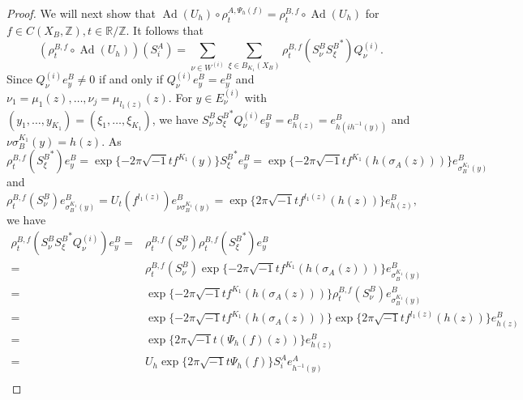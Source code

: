 \documentclass[11pt]{article}
\theoremstyle{plain}
\theoremstyle{definition}
\numberwithin{equation}{section}
\newcommand{\Ad}{\operatorname{Ad}}
\newcommand{\RZ}{\mathbb{R}/{\mathbb{Z}}}
\newcommand{\Z}{\mathbb{Z}}
\begin{document}
\begin{proof}
We will next show that 
$
\Ad(U_h) \circ  \rho^{A,\Psi_h(f)}_t
= \rho^{B,f}_t \circ \Ad(U_h)
$
for $f \in C(X_B,\Z),
t \in \RZ.
$
It follows that 
\begin{equation}
(\rho^{B,f}_t \circ \Ad(U_h)) (S_i^A) 
 =  \sum_{\nu \in W^{(i)}} \sum_{\xi\in B_{K_1}(X_B)}
    \rho_t^{B,f}(S_{\nu}^B {S_\xi^B}^*) Q_\nu^{(i)}. \label{eq:rhoBtf}
\end{equation}
Since
$Q_\nu^{(i)}e_y^B \ne 0$ if and only if
$Q_\nu^{(i)}e_y^B  = e_y^B$ and $\nu_1 = \mu_1(z),\dots, \nu_j = \mu_{l_1(z)}(z)$.
For $y \in E_\nu^{(i)}$
with $(y_1,\dots,y_{K_1}) = (\xi_1,\dots,\xi_{K_1})$, 
we have 
$S_{\nu}^B {S_\xi^B}^* Q_\nu^{(i)}e_y^B = e_{h(z)}^B = e_{h(ih^{-1}(y))}^B$
and
$\nu \sigma_B^{K_1}(y) = h(z).$
As
\begin{equation*}
\rho_t^{B,f}({S_\xi^B}^*)e_y^B 
=\exp\{-2\pi \sqrt{-1}t f^{K_1}(y) \}{S_\xi^B}^* e_y^B 
=\exp\{-2\pi \sqrt{-1}t f^{K_1}(h(\sigma_A(z)))\}
e_{\sigma_B^{K_1}(y)}^B 
\end{equation*}
and
\begin{equation*}
\rho_t^{B,f}(S_{\nu}^B) e_{\sigma_B^{K_1}(y)}^B
  = U_t(f^{l_1(z)} )  e_{\nu \sigma_B^{K_1}(y)}^B   
  =\exp\{2\pi \sqrt{-1}t f^{l_1(z)} (h(z))\} e_{h(z)}^B, 
\end{equation*}
we have  
\begin{align*}
    \rho_t^{B,f}(S_{\nu}^B {S_\xi^B}^* Q_\nu^{(i)} ) e_y^B 
=  & \rho_t^{B,f}(S_{\nu}^B) \rho_t^{B,f}({S_\xi^B}^*)e_y^B \\
=  & \rho_t^{B,f}(S_{\nu}^B) 
     \exp\{-2\pi \sqrt{-1}t f^{K_1}(h(\sigma_A(z)))\}
     e_{\sigma_B^{K_1}(y)}^B  \\
=  & \exp\{-2\pi \sqrt{-1}t f^{K_1}(h(\sigma_A(z))) \}
     \rho_t^{B,f}(S_{\nu}^B) e_{\sigma_B^{K_1}(y)}^B  \\
=  & \exp\{-2\pi \sqrt{-1}t f^{K_1}(h(\sigma_A(z))) \}
     \exp\{2\pi \sqrt{-1}t f^{l_1(z)}(h(z)) \}
     e_{h(z)}^B \\
= & \exp\{2\pi \sqrt{-1}t(\Psi_h(f)(z))\} e_{h(z)}^B \\ 
= & U_h \exp\{2\pi \sqrt{-1}t\Psi_h(f)\} S_i^A e_{h^{-1}(y)}^A \\

\end{align*}
\end{proof}
\end{document}
